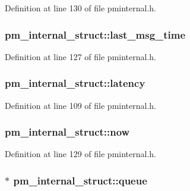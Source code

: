 Definition at line 130 of file pminternal.\+h.

\subsubsection[{\texorpdfstring{last\+\_\+msg\+\_\+time}{last_msg_time}}]{ pm\+\_\+internal\+\_\+struct\+::last\+\_\+msg\+\_\+time}\hypertarget{structpm__internal__struct_a1c82783ec6511e4303b511fdb05e99d8}{}\label{structpm__internal__struct_a1c82783ec6511e4303b511fdb05e99d8}


Definition at line 127 of file pminternal.\+h.

\subsubsection[{\texorpdfstring{latency}{latency}}]{ pm\+\_\+internal\+\_\+struct\+::latency}\hypertarget{structpm__internal__struct_ad1458cf67c24a176a66dd8350c50ac0a}{}\label{structpm__internal__struct_ad1458cf67c24a176a66dd8350c50ac0a}


Definition at line 109 of file pminternal.\+h.

\subsubsection[{\texorpdfstring{now}{now}}]{ pm\+\_\+internal\+\_\+struct\+::now}\hypertarget{structpm__internal__struct_ab7152c01f41a2c1c416b6720bc81c220}{}\label{structpm__internal__struct_ab7152c01f41a2c1c416b6720bc81c220}


Definition at line 129 of file pminternal.\+h.

\subsubsection[{\texorpdfstring{queue}{queue}}]{$\ast$ pm\+\_\+internal\+\_\+struct\+::queue}\hypertarget{structpm__internal__struct_a883e467783d250a41089efa00df2bb4c}{}\label{structpm__internal__struct_a883e467783d250a41089efa00df2bb4c}


